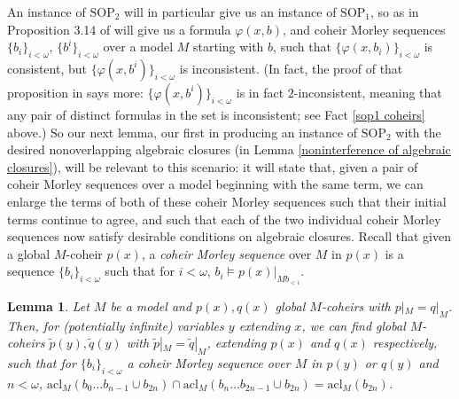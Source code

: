 \documentclass{amsart}
\newtheorem{lemma}[theorem]{Lemma}
\theoremstyle{definition}
\theoremstyle{remark}
\numberwithin{equation}{section}
\begin{document}
An instance of $\mathrm{SOP}_{2}$ will in particular give us an instance of $\mathrm{SOP}_{1}$, so as in Proposition 3.14 of \cite{KR17} will give us a formula $\varphi(x, b)$, and coheir Morley sequences $\{b_{i}\}_{i< \omega}$, $\{b^{i}\}_{i< \omega}$ over a model $M$ starting with $b$, such that $\{\varphi(x, b_i)\}_{i < \omega}$ is consistent, but $\{\varphi(x, b^i)\}_{i < \omega}$ is inconsistent. (In fact, the proof of that proposition in \cite{KR17} says more: $\{\varphi(x, b^i)\}_{i < \omega}$ is in fact $2$-inconsistent, meaning that any pair of distinct formulas in the set is inconsistent; see Fact \ref{sop1 coheirs} above.)  So our next lemma, our first in producing an instance of $\mathrm{SOP}_{2}$ with the desired nonoverlapping algebraic closures (in Lemma \ref{noninterference of algebraic closures}), will be relevant to this scenario: it will state that, given a pair of coheir Morley sequences over a model beginning with the same term, we can enlarge the terms of both of these coheir Morley sequences such that their initial terms continue to agree, and such that each of the two individual coheir Morley sequences now satisfy desirable conditions on algebraic closures. Recall that given a global $M$-coheir $p(x)$, a \textit{coheir Morley sequence} over $M$ in $p(x)$ is a sequence $\{b_i\}_{i < \omega}$ such that for $i < \omega$, $b_{i} \models p(x)|_{Mb_{< i}}$.




\begin{lemma}
\label{pair of normal coheirs}    Let $M$ be a model and $p(x), q(x)$ global $M$-coheirs with $p|_{M} = q|_M$. Then, for (potentially infinite) variables $y$ extending $x$, we can find global $M$-coheirs $\tilde{p}(y), \tilde{q}(y)$ with $\tilde{p}|_{M} = \tilde{q}|_{M}$, extending $p(x)$ and $q(x)$ respectively, such that for $\{b_{i}\}_{i < \omega}$ a coheir Morley sequence over $M$ in $p(y)$ or $q(y)$ and $n < \omega$, $\mathrm{acl}_{M}(b_{0} \ldots b_{n-1} \cup b_{2n}) \cap \mathrm{acl}_{M}(b_{n} \ldots b_{2n-1} \cup b_{2n})=\mathrm{acl}_{M}(b_{2n})$.
\end{lemma}
\end{document}
